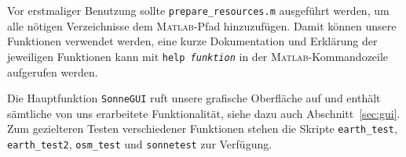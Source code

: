 \documentclass[
    paper=a4,
    DIV14,
    fontsize=12pt,
    pagesize=pdftex,
    toc=bibliographynumbered
]{scrartcl}
\numberwithin{figure}{section}
\numberwithin{equation}{section}
\numberwithin{table}{section}
\begin{document}
Vor erstmaliger Benutzung sollte \verb|prepare_resources.m| ausgeführt werden, um alle
nötigen Verzeichnisse dem \textsc{Matlab}-Pfad hinzuzufügen. Damit können unsere
Funktionen verwendet werden, eine kurze Dokumentation und Erklärung der jeweiligen
Funktionen kann mit \texttt{help \textit{funktion}} in der \textsc{Matlab}-Kommandozeile
aufgerufen werden.

Die Hauptfunktion \texttt{SonneGUI} ruft unsere grafische Oberfläche auf und enthält
sämtliche von uns erarbeitete Funktionalität, siehe dazu auch Abschnitt~\ref{sec:gui}. Zum
gezielteren Testen verschiedener Funktionen stehen die Skripte \verb|earth_test|,
\verb|earth_test2|, \verb|osm_test| und \verb|sonnetest| zur Verfügung.
\end{document}
